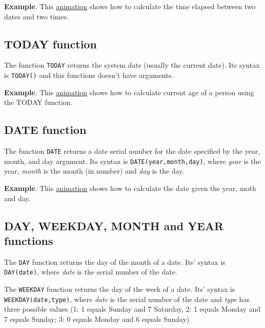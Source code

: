 \textbf{Example}. This \href{http://aprendeconalf.es/office/excel/manual/img/example_time_elapsed.gif}{animation} shows how to calculate the time elapsed between two dates and two times.

\subsection{TODAY function}\hypertarget{today-function}{}\label{today-function}

The function \texttt{TODAY} returns the system date (usually the current date). Its syntax is \texttt{TODAY()} and this functions doesn't have arguments.

\textbf{Example}. This \href{http://aprendeconalf.es/office/excel/manual/img/example_function_today.gif}{animation} shows how to calculate current age of a person using the TODAY function.

\subsection{DATE function}\hypertarget{date-function}{}\label{date-function}

The function \texttt{DATE} returns a date serial number for the date specified by the year, month, and day argument. Its syntax is \texttt{DATE(year,month,day)}, where \emph{year} is the year, \emph{month} is the month (in number) and \emph{day} is the day.

\textbf{Example}. This \href{http://aprendeconalf.es/office/excel/manual/img/example_function_date.gif}{animation} shows how to calculate the date given the year, moth and day.

\subsection{DAY, WEEKDAY, MONTH and YEAR functions}\hypertarget{day-weekday-month-and-year-functions}{}\label{day-weekday-month-and-year-functions}

The \texttt{DAY} function returns the day of the month of a date. Its' syntax is \texttt{DAY(date)}, where \emph{date} is the serial number of the date.

The \texttt{WEEKDAY} function returns the day of the week of a date. Its' syntax is \texttt{WEEKDAY(date,type)}, where \emph{date} is the serial number of the date and \emph{type} has three possible values (1: 1 equals Sunday and 7 Saturday, 2: 1 equals Monday and 7 equals Sunday; 3: 0 equals Monday and 6 equals Sunday).

